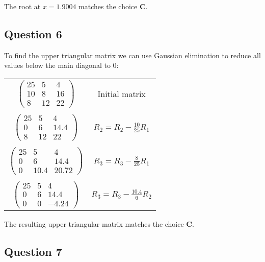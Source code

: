 \documentclass[12pt]{article}
\begin{document}
The root at $x = 1.9004$ matches the choice \textbf{C}.

\subsection*{Question 6}

To find the upper triangular matrix we can use Gaussian elimination to reduce all values below the main diagonal to 0:

\begin{center}
    \begin{tabular}{cc}
        $$\begin{pmatrix}
            25 & 5 & 4 \\
            10 & 8 & 16 \\
            8 & 12 & 22
        \end{pmatrix}$$ & Initial matrix \\ \\
        $$\begin{pmatrix}
            25 & 5 & 4 \\
            0 & 6 & 14.4 \\
            8 & 12 & 22
        \end{pmatrix}$$ & $R_2 = R_2 - \frac{10}{25}R_1$ \\ \\
        $$\begin{pmatrix}
            25 & 5 & 4 \\
            0 & 6 & 14.4 \\
            0 & 10.4 & 20.72
        \end{pmatrix}$$ & $R_3 = R_3 - \frac{8}{25}R_1$ \\ \\
        $$\begin{pmatrix}
            25 & 5 & 4 \\
            0 & 6 & 14.4 \\
            0 & 0 & -4.24
        \end{pmatrix}$$ & $R_3 = R_3 - \frac{10.4}{6}R_2$
    \end{tabular}
\end{center}

The resulting upper triangular matrix matches the choice \textbf{C}.

\subsection*{Question 7}
\end{document}
